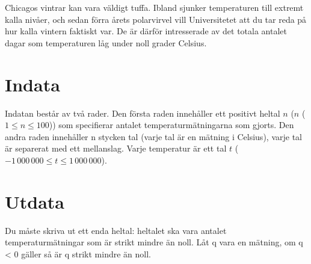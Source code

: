 Chicagos vintrar kan vara väldigt tuffa. Ibland sjunker temperaturen till extremt kalla nivåer, och sedan förra årets polarvirvel vill Universitetet att du tar reda på hur kalla vintern faktiskt var. De är därför intresserade av det totala antalet dagar som temperaturen låg under noll grader Celsius.

\section*{Indata}
Indatan består av två rader. Den första raden innehåller ett positivt heltal $n$ ($n$ ($1 \le n \le 100$)) som specifierar antalet temperaturmätningarna som gjorts. Den andra raden innehåller n stycken tal (varje tal är en mätning i Celsius), varje tal är separerat med ett mellanslag. Varje temperatur är ett tal $t$ ($-1\,000\,000 \le t \le 1\,000\,000$).

\section*{Utdata}
Du måste skriva ut ett enda heltal: heltalet ska vara antalet temperaturmätningar som är strikt mindre än noll.
Låt q vara en mätning, om q < 0 gäller så är q strikt mindre än noll.
